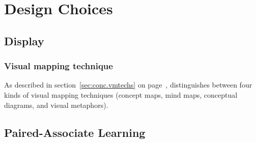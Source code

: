 \chapter{Design Choices}

    \section{Display}

        \subsection{Visual mapping technique}

        As described in section~\ref{sec:conc.vmtechs} on page~\pageref{sec.conc.vmtechs},  distinguishes between four kinds of visual mapping techniques (concept maps, mind maps, conceptual diagrams, and visual metaphors).

    \section{Paired-Associate Learning}
